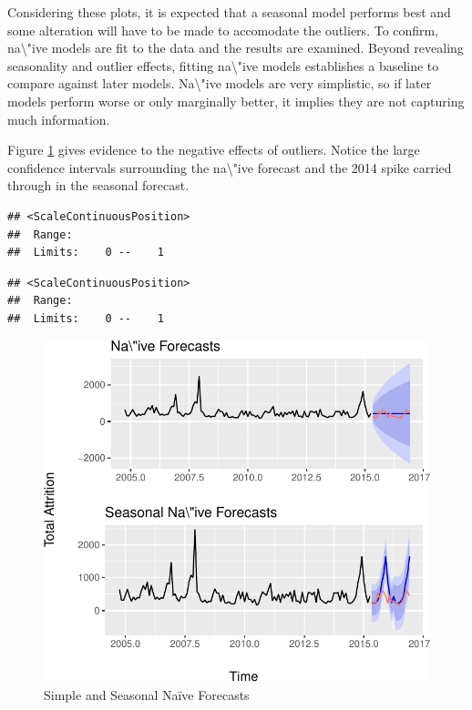 \documentclass[12pt,letterpaper,toc=flat,oneside]{report}
\theoremstyle{definition}
\theoremstyle{definition}
\theoremstyle{definition}
\theoremstyle{remark}
\begin{document}
Considering these plots, it is expected that a seasonal model performs
best and some alteration will have to be made to accomodate the
outliers. To confirm, na\textbackslash{}"ive models are fit to the data
and the results are examined. Beyond revealing seasonality and outlier
effects, fitting na\textbackslash{}"ive models establishes a baseline to
compare against later models. Na\textbackslash{}"ive models are very
simplistic, so if later models perform worse or only marginally better,
it implies they are not capturing much information.

Figure \ref{fig:n-sn-forecast} gives evidence to the negative effects of
outliers. Notice the large confidence intervals surrounding the
na\textbackslash{}"ive forecast and the 2014 spike carried through in
the seasonal forecast.

\begin{verbatim}
## <ScaleContinuousPosition>
##  Range:  
##  Limits:    0 --    1
\end{verbatim}

\begin{verbatim}
## <ScaleContinuousPosition>
##  Range:  
##  Limits:    0 --    1
\end{verbatim}

\begin{figure}[H]

{\centering \includegraphics{elliott-econometric-personnel-retention-18_files/figure-latex/n-sn-forecast-1} 

}

\caption{Simple and Seasonal Na\"ive Forecasts}\label{fig:n-sn-forecast}
\end{figure}
\end{document}

